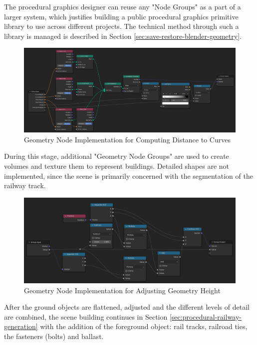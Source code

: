 The procedural graphics designer can reuse any "Node Groups" as a part of a larger system, which justifies building a public procedural graphics primitive library to use across different projects. The technical method through such a library is managed is described in Section \ref{sec:save-restore-blender-geometry}.

\begin{figure}[H]
    \centering
    \includegraphics[width=14.5cm]{src/img/pic/pic-3 blender geometry screenshot curve_distance.jpg}
    \caption{Geometry Node Implementation for Computing Distance to Curves}
    \label{fig:impl-curve-dist}
\end{figure}

During this stage, additional "Geometry Node Groups" are used to create volumes and texture them to represent buildings. Detailed shapes are not implemented, since the scene is primarily concerned with the segmentation of the railway track.

\begin{figure}[H]
    \centering
    \includegraphics[width=14.5cm]{src/img/pic/pic-4 blender geometry node screenshot adjust_z_to_match_pos.jpg}
    \caption{Geometry Node Implementation for Adjusting Geometry Height}
    \label{fig:impl-adjust-z-to-match-pos}
\end{figure}

After the ground objects are flattened, adjusted and the different levels of detail are combined, the scene building continues in Section \ref{sec:procedural-railway-generation} with the addition of the foreground object: rail tracks, railroad ties, the fasteners (bolts) and ballast.


